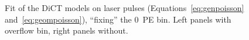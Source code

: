 \begin{figure}
    
    
    \caption{\label{fig:ctfitlaser1} Fit of the DiCT models on laser pulses
    (Equations~\ref{eq:genpoisson} and~\ref{eq:geompoisson}), ``fixing'' the
    0~PE bin. Left panels with overflow bin, right panels without.
    }

\end{figure}

\begin{figure}
    

    
\end{figure}
